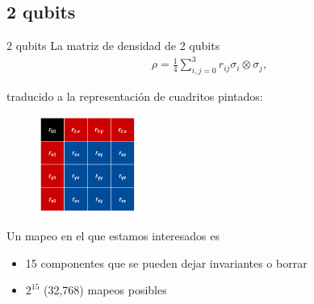 \documentclass[11pt,xcolor=dvipsnames]{beamer}
\begin{document}
\subsection{2 qubits}
\begin{frame}{2 qubits}
	La matriz de densidad de 2 qubits 
	\begin{align*}
		\rho = \frac{1}{4} \sum _{i,j=0}^3 r_{ij} \sigma _i \otimes \sigma _j,
	\end{align*}\vfill \pause

	traducido a la representación de cuadritos pintados:
	\begin{figure}[H]
		\centering
	  \includegraphics[width=3.2cm]{img-congreso/rho2q(2)}
	\end{figure}
\end{frame}



\begin{frame}
	Un mapeo en el que estamos interesados es
	\begin{center}
	\end{center}\pause
	
	\begin{itemize}[label=$\textcolor{Blue}{\blacktriangleright}$]
		\item<2-> 15 componentes que se pueden dejar invariantes o borrar
		\item<3-> $2^{15}$ (32,768) mapeos posibles
	\end{itemize}
\end{frame}
\end{document}
